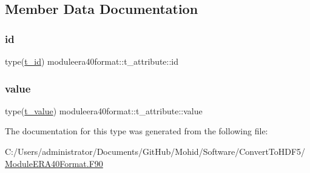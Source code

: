 \subsection{Member Data Documentation}
\mbox{\label{structmoduleera40format_1_1t__attribute_a356732e6fbb1b1550724bf402872c46a}} 
\subsubsection{\texorpdfstring{id}{id}}
{\footnotesize\ttfamily type(\mbox{\hyperlink{structmoduleera40format_1_1t__id}{t\+\_\+id}}) moduleera40format\+::t\+\_\+attribute\+::id\hspace{0.3cm}{\ttfamily [private]}}

\mbox{\label{structmoduleera40format_1_1t__attribute_ab4796a35681a19055b9f2075335331c9}} 
\subsubsection{\texorpdfstring{value}{value}}
{\footnotesize\ttfamily type(\mbox{\hyperlink{structmoduleera40format_1_1t__value}{t\+\_\+value}}) moduleera40format\+::t\+\_\+attribute\+::value\hspace{0.3cm}{\ttfamily [private]}}



The documentation for this type was generated from the following file\+:\begin{DoxyCompactItemize}
\item 
C\+:/\+Users/administrator/\+Documents/\+Git\+Hub/\+Mohid/\+Software/\+Convert\+To\+H\+D\+F5/\mbox{\hyperlink{_module_e_r_a40_format_8_f90}{Module\+E\+R\+A40\+Format.\+F90}}\end{DoxyCompactItemize}
